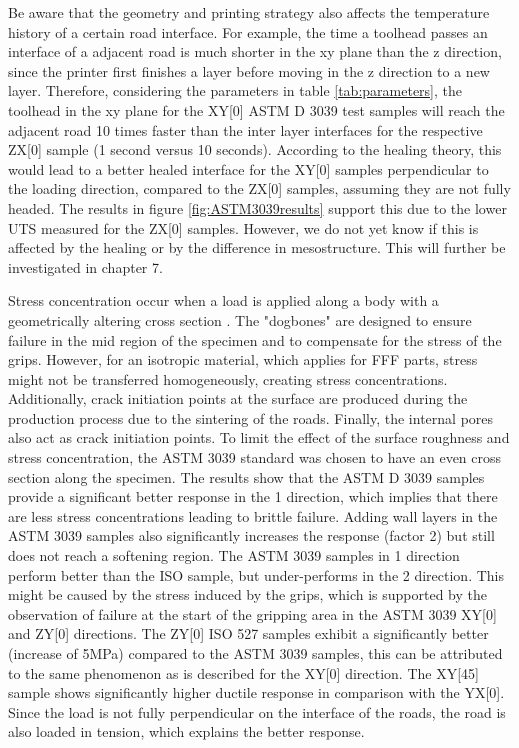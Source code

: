 Be aware that the geometry and printing strategy also affects the temperature history of a certain road interface. For example, the time a toolhead passes an interface of a adjacent road is much shorter in the xy plane than the z direction, since the printer first finishes a layer before moving in the z direction to a new layer. Therefore, considering the parameters in table \ref{tab:parameters}, the toolhead in the xy plane for the XY[0] ASTM D 3039 test samples will reach the adjacent road 10 times faster than the inter layer interfaces for the respective ZX[0] sample (1 second versus 10 seconds). According to the healing theory, this would lead to a better healed interface for the XY[0] samples perpendicular to the loading direction, compared to the ZX[0] samples, assuming they are not fully headed. The results in figure \ref{fig:ASTM3039results} support this due to the lower UTS measured for the ZX[0] samples. However, we do not yet know if this is affected by the healing or by the difference in mesostructure. This will further be investigated in chapter 7. 

Stress concentration occur when a load is applied along a body with a geometrically altering cross section \cite{TronvollTheApproach}. The "dogbones" are designed to ensure failure in the mid region of the specimen and to compensate for the stress of the grips. However, for an isotropic material, which applies for FFF parts, stress might not be transferred homogeneously, creating stress concentrations. Additionally, crack initiation points at the surface are produced during the production process due to the sintering of the roads. Finally, the internal pores also act as crack initiation points. To limit the effect of the surface roughness and stress concentration, the ASTM 3039 standard was chosen to have an even cross section along the specimen. The results show that the ASTM D 3039 samples provide a significant better response in the 1 direction, which implies that there are less stress concentrations leading to brittle failure. Adding wall layers in the ASTM 3039 samples also significantly increases the response (factor 2) but still does not reach a softening region. The ASTM 3039 samples in 1 direction perform better than the ISO sample, but under-performs in the 2 direction. This might be caused by the stress induced by the grips, which is supported by the observation of failure at the start of the gripping area in the ASTM 3039  XY[0] and ZY[0] directions. The ZY[0] ISO 527 samples exhibit a significantly better (increase of 5MPa) compared to the ASTM 3039 samples, this can be attributed to the same phenomenon as is described for the XY[0] direction.
The XY[45] sample shows significantly higher ductile response in comparison with the YX[0]. Since the load is not fully perpendicular on the interface of the roads, the road is also loaded in tension, which explains the better response.

